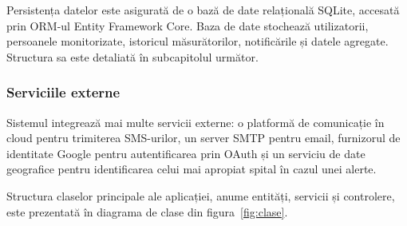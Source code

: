 ﻿\documentclass[12pt,a4paper,twoside]{article}
\begin{document}
Persistența datelor este asigurată de o bază de date relațională SQLite, accesată prin ORM-ul Entity Framework Core. Baza de date stochează utilizatorii, persoanele monitorizate, istoricul măsurătorilor, notificările și datele agregate. Structura sa este detaliată în subcapitolul următor.

\subsubsection{Serviciile externe}

Sistemul integrează mai multe servicii externe: o platformă de comunicație în cloud pentru trimiterea SMS-urilor, un server SMTP pentru email, furnizorul de identitate Google pentru autentificarea prin OAuth și un serviciu de date geografice pentru identificarea celui mai apropiat spital în cazul unei alerte.

Structura claselor principale ale aplicației, anume entități, servicii și controlere, este prezentată în diagrama de clase din figura~\ref{fig:clase}.
\end{document}
